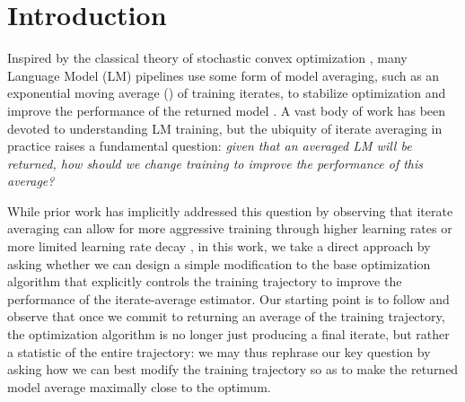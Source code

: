 \section{Introduction}



%









Inspired by the classical theory of stochastic convex optimization \citep{ruppert1988efficient,polyak1992acceleration}, many Language Model (LM) pipelines use some form of model averaging, such as an exponential moving average (\ema) of training iterates, to stabilize optimization and improve the performance of the returned model \citep{izmailov2018averaging,kaddour2022stop,block2025ema,block2024butterfly,busbridge2023scale,olmo20242,lambert2024tulu,wortsman2022model,smollm2}.  A vast body of work has been devoted to understanding LM training, but the ubiquity of iterate averaging in practice raises a fundamental question: \emph{given that an averaged LM will be returned, how should we change training to improve the performance of this average?}

While prior work has implicitly addressed this question by observing that iterate averaging can allow for more aggressive training through higher learning rates or more limited learning rate decay \citep{defazio2024schedule,block2024butterfly,block2025ema}, in this work, we take a direct approach by asking whether we can design a simple modification to the base optimization algorithm that explicitly controls the training trajectory to improve the performance of the iterate-average estimator.  Our starting point is to follow \citet{block2025ema} and observe that once we commit to returning an average of the training trajectory, the optimization algorithm is no longer just producing a final iterate, but rather a statistic of the entire trajectory: we may thus rephrase our key question by asking how we can best modify the training trajectory so as to make the returned model average maximally close to the optimum.


